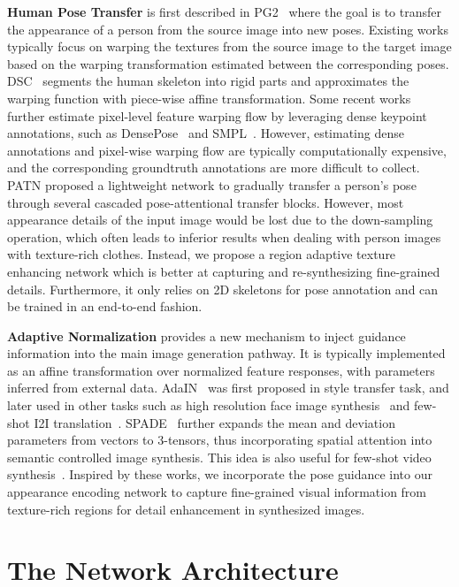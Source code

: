 \documentclass{article}
\begin{document}
\textbf{Human Pose Transfer} is first described in PG2~\cite{PG2} where the goal is to transfer the appearance of a person from the source image into new poses.
Existing works typically focus on warping the textures from the source image to the target image based on the warping transformation estimated between the corresponding poses. DSC~\cite{DeformableGAN} segments the human skeleton into rigid parts and approximates the warping function with piece-wise affine transformation. Some recent works~\cite{DensePoseTransfer,softgate,DIAF,liquidwarpinggan} further estimate pixel-level feature warping flow by leveraging dense keypoint annotations, such as DensePose~\cite{densepose} and SMPL~\cite{SMPL}.
However, estimating dense annotations and pixel-wise warping flow are typically computationally expensive, and the corresponding groundtruth annotations are more difficult to collect. PATN\cite{PATN} proposed a lightweight network to gradually transfer a person's pose through several cascaded pose-attentional transfer blocks. However, most appearance details of the input image would be lost due to the down-sampling operation, which often leads to inferior results when dealing with person images with texture-rich clothes. Instead, we propose a region adaptive texture enhancing network which is better at capturing and re-synthesizing fine-grained details. Furthermore, it only relies on 2D skeletons for pose annotation and can be trained in an end-to-end fashion.

\textbf{Adaptive Normalization} provides a new mechanism to inject guidance information into the main image generation pathway. It is typically implemented as an affine transformation over normalized feature responses, with parameters inferred from external data. AdaIN~\cite{adain} was first proposed in style transfer task, and later used in other tasks such as high resolution face image synthesis~\cite{stylegan} and few-shot I2I translation~\cite{funit}. SPADE~\cite{spade} further expands the mean and deviation parameters from vectors to 3-tensors, thus incorporating spatial attention into semantic controlled image synthesis. This idea is also useful for few-shot video synthesis~\cite{fewshotvid2vid}. Inspired by these works, we incorporate the pose guidance into our appearance encoding network to capture fine-grained visual information from texture-rich regions for detail enhancement in synthesized images.

\section{The Network Architecture}
\end{document}
